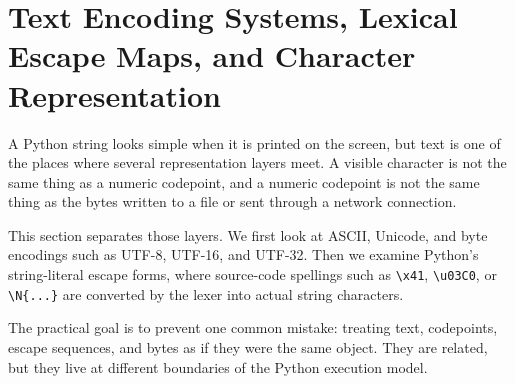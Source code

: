 \section{Text Encoding Systems, Lexical Escape Maps, and Character Representation}

A Python string looks simple when it is printed on the screen, but text is one of the places where several representation layers meet. A visible character is not the same thing as a numeric codepoint, and a numeric codepoint is not the same thing as the bytes written to a file or sent through a network connection.

This section separates those layers. We first look at ASCII, Unicode, and byte encodings such as UTF-8, UTF-16, and UTF-32. Then we examine Python's string-literal escape forms, where source-code spellings such as \texttt{\textbackslash x41}, \texttt{\textbackslash u03C0}, or \texttt{\textbackslash N\{...\}} are converted by the lexer into actual string characters.

The practical goal is to prevent one common mistake: treating text, codepoints, escape sequences, and bytes as if they were the same object. They are related, but they live at different boundaries of the Python execution model.
